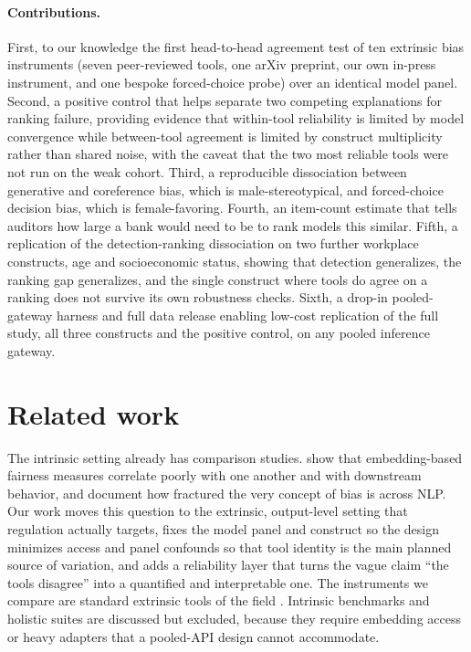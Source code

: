 \documentclass[11pt]{article}
\begin{document}
\paragraph{Contributions.} First, to our knowledge the first head-to-head agreement test of ten extrinsic bias instruments (seven peer-reviewed tools, one arXiv preprint, our own in-press instrument, and one bespoke forced-choice probe) over an identical model panel. Second, a positive control that helps separate two competing explanations for ranking failure, providing evidence that within-tool reliability is limited by model convergence while between-tool agreement is limited by construct multiplicity rather than shared noise, with the caveat that the two most reliable tools were not run on the weak cohort. Third, a reproducible dissociation between generative and coreference bias, which is male-stereotypical, and forced-choice decision bias, which is female-favoring. Fourth, an item-count estimate that tells auditors how large a bank would need to be to rank models this similar. Fifth, a replication of the detection-ranking dissociation on two further workplace constructs, age and socioeconomic status, showing that detection generalizes, the ranking gap generalizes, and the single construct where tools do agree on a ranking does not survive its own robustness checks. Sixth, a drop-in pooled-gateway harness and full data release enabling low-cost replication of the full study, all three constructs and the positive control, on any pooled inference gateway.

\section{Related work}
The intrinsic setting already has comparison studies. \citet{delobelle2022measuring} show that embedding-based fairness measures correlate poorly with one another and with downstream behavior, and \citet{blodgett2020language} document how fractured the very concept of bias is across NLP. Our work moves this question to the extrinsic, output-level setting that regulation actually targets, fixes the model panel and construct so the design minimizes access and panel confounds so that tool identity is the main planned source of variation, and adds a reliability layer that turns the vague claim ``the tools disagree'' into a quantified and interpretable one. The instruments we compare are standard extrinsic tools of the field \citep{parrish2022bbq,wan2023biasasker,cheng2023marked,santurkar2023opinionqa,guey2026biaslab,wan2023kelly,tamkin2023discrimeval,dhamala2021bold,zhao2018winobias}. Intrinsic benchmarks \citep{nadeem2021stereoset,nangia2020crows} and holistic suites \citep{liang2023helm} are discussed but excluded, because they require embedding access or heavy adapters that a pooled-API design cannot accommodate.
\end{document}
